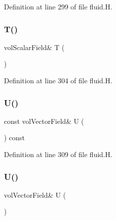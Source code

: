 Definition at line 299 of file fluid.\+H.

\mbox{\label{classFoam_1_1fluid_aae0cfe1315f717e86f7dc657c35a476d}} 
\subsubsection{\texorpdfstring{T()}{T()}\hspace{0.1cm}{\footnotesize\ttfamily [2/2]}}
{\footnotesize\ttfamily vol\+Scalar\+Field\& T (\begin{DoxyParamCaption}{ }\end{DoxyParamCaption})\hspace{0.3cm}{\ttfamily [inline]}}



Definition at line 304 of file fluid.\+H.

\mbox{\label{classFoam_1_1fluid_a536d168d7b335fe81f506f232b5b4872}} 
\subsubsection{\texorpdfstring{U()}{U()}\hspace{0.1cm}{\footnotesize\ttfamily [1/2]}}
{\footnotesize\ttfamily const vol\+Vector\+Field\& U (\begin{DoxyParamCaption}{ }\end{DoxyParamCaption}) const\hspace{0.3cm}{\ttfamily [inline]}}



Definition at line 309 of file fluid.\+H.

\mbox{\label{classFoam_1_1fluid_a9152a436c08509f3f18e0298a7239d13}} 
\subsubsection{\texorpdfstring{U()}{U()}\hspace{0.1cm}{\footnotesize\ttfamily [2/2]}}
{\footnotesize\ttfamily vol\+Vector\+Field\& U (\begin{DoxyParamCaption}{ }\end{DoxyParamCaption})\hspace{0.3cm}{\ttfamily [inline]}}



